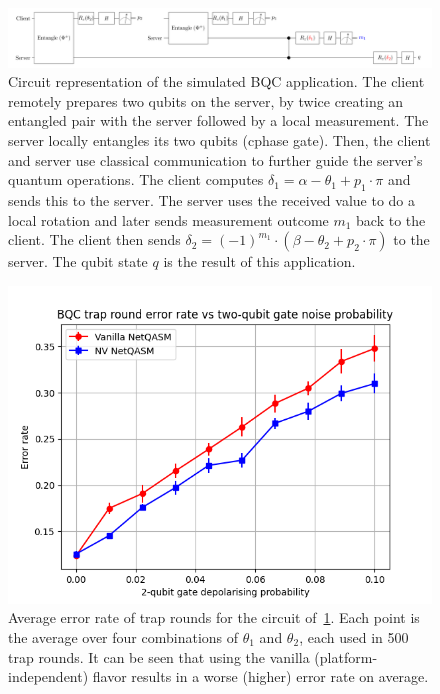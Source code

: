 \begin{figure}
  \centering
  \includegraphics[width=\textwidth]{figures/netqasm/bqc_app.png}
  \caption{Circuit representation of the simulated BQC application. The client
    remotely prepares two qubits on the server, by twice creating an
    entangled pair with the server followed by a local measurement. The
    server locally entangles its two qubits (cphase gate). Then, the client
    and server use classical communication to further guide the server's
    quantum operations. The client computes $\delta_1 = \alpha - \theta_1 +
      p_1 \cdot \pi$ and sends this to the server. The server uses the
    received value to do a local rotation and later sends measurement
    outcome $m_1$ back to the client. The client then sends $\delta_2 =
      (-1)^{m_1} \cdot (\beta - \theta_2 + p_2 \cdot \pi)$ to the server.
    The qubit state $q$ is the result of this application.
  }
  \label{fig:bqc_app}
\end{figure}


\begin{figure}
  \centering
  \includegraphics[scale=0.8]{figures/netqasm/plots/bqc_sweep_gate_noise_trap.png}
  \caption{
    Average error rate of trap rounds for the circuit of~\cref{fig:bqc_app}.
    Each point is the average over four combinations of $\theta_1$ and $\theta_2$,
    each used in 500 trap rounds. It can be seen that using the vanilla (platform-independent)
    \netqasm flavor results in a worse (higher) error rate on average.}
  \label{fig:plot_bqc}
\end{figure}

